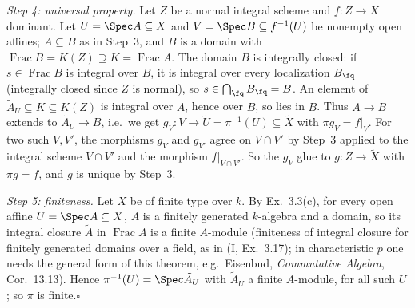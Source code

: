 \documentclass[11pt]{article}
\begin{document}
\emph{Step 4: universal property.} Let $Z$ be a normal integral scheme and $f:Z\to X$ dominant. Let $U=\Spec A\subseteq X$ and $V=\Spec B\subseteq f^{-1}(U)$ be nonempty open affines; $A\subseteq B$ as in Step~3, and $B$ is a domain with $\operatorname{Frac}B=K(Z)\supseteq K=\operatorname{Frac}A$. The domain $B$ is integrally closed: if $s\in\operatorname{Frac}B$ is integral over $B$, it is integral over every localization $B_\fq$ (integrally closed since $Z$ is normal), so $s\in\bigcap_{\fq}B_\fq=B$. An element of $\tilde A_U\subseteq K\subseteq K(Z)$ is integral over $A$, hence over $B$, so lies in $B$. Thus $A\to B$ extends to $\tilde A_U\to B$, i.e.\ we get $g_V:V\to\tilde U=\pi^{-1}(U)\subseteq\tilde X$ with $\pi g_V=f|_V$. For two such $V,V'$, the morphisms $g_V$ and $g_{V'}$ agree on $V\cap V'$ by Step~3 applied to the integral scheme $V\cap V'$ and the morphism $f|_{V\cap V'}$. So the $g_V$ glue to $g:Z\to\tilde X$ with $\pi g=f$, and $g$ is unique by Step~3.

\emph{Step 5: finiteness.} Let $X$ be of finite type over $k$. By Ex.~3.3(c), for every open affine $U=\Spec A\subseteq X$, $A$ is a finitely generated $k$-algebra and a domain, so its integral closure $\tilde A$ in $\operatorname{Frac}A$ is a finite $A$-module (finiteness of integral closure for finitely generated domains over a field, as in (I, Ex.~3.17); in characteristic $p$ one needs the general form of this theorem, e.g.\ Eisenbud, \emph{Commutative Algebra}, Cor.~13.13). Hence $\pi^{-1}(U)=\Spec\tilde A_U$ with $\tilde A_U$ a finite $A$-module, for all such $U$; so $\pi$ is finite.\hfill$\square$
\end{document}
